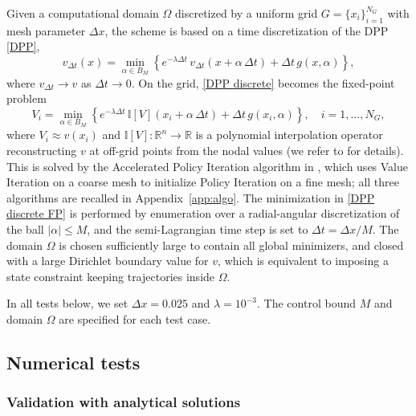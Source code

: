 \documentclass[12pt]{amsart}
\numberwithin{equation}{section}
\theoremstyle{plain}
\begin{document}
Given a computational domain $\Omega$ discretized by a uniform grid $G = \{x_i\}_{i=1}^{N_G}$ with mesh parameter $\Delta x$, the scheme is based on a time discretization of the DPP \eqref{DPP},
\begin{equation}\label{DPP discrete}
	v_{\Delta t}(x) = \min_{\alpha \in B_M} \left\{ e^{-\lambda \Delta t} \, v_{\Delta t}\left(x + \alpha\,\Delta t \right) + \Delta t \,g(x,\alpha) \right\},
\end{equation}
where $v_{\Delta t} \to v$ as $\Delta t \to 0$. On the grid, \eqref{DPP discrete} becomes the fixed-point problem
\begin{equation}\label{DPP discrete FP}
	V_i = \min_{\alpha\in B_M} \left\{ e^{-\lambda \Delta t} \,\mathds{I}[V]\!\left(x_i + \alpha\,\Delta t \right) + \Delta t\, g(x_i,\alpha) \right\}, \quad i=1,\ldots,N_G,
\end{equation}
where $V_i \approx v(x_i)$ and $\mathds{I}[V]:\mathbb{R}^n\to\mathbb{R}$ is a polynomial interpolation operator reconstructing $v$ at off-grid points from the nodal values (we refer to \cite[Appendix A]{bardi1997optimal} for details). This is solved by the Accelerated Policy Iteration algorithm in \cite{alla2015efficient}, which uses Value Iteration on a coarse mesh to initialize Policy Iteration on a fine mesh; all three algorithms are recalled in Appendix~\ref{app:algo}. The minimization in \eqref{DPP discrete FP} is performed by enumeration over a radial-angular discretization of the ball $|\alpha| \leq M$, and the semi-Lagrangian time step is set to $\Delta t = \Delta x / M$. The domain $\Omega$ is chosen sufficiently large to contain all global minimizers, and closed with a large Dirichlet boundary value for $v$, which is equivalent to imposing a state constraint keeping trajectories inside $\Omega$.

In all tests below, we set $\Delta x = 0.025$ and $\lambda = 10^{-3}$. The control bound $M$ and domain $\Omega$ are specified for each test case.

\subsection{Numerical tests}

\subsubsection{Validation with analytical solutions}
\end{document}
